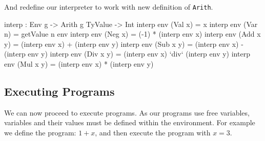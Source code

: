 And redefine our interpreter to work with new definition of \texttt{Arith}.

\begin{code}
interp : Env g -> Arith g TyValue -> Int
interp env (Val x)    = x
interp env (Var n)    = getValue n env
interp env (Neg x)    = (-1) * (interp env x)
interp env (Add x y)  = (interp env x) + (interp env y)
interp env (Sub x y)  = (interp env x) - (interp env y)
interp env (Div x y)  = (interp env x) `div` (interp env y)
interp env (Mul x y)  = (interp env x) * (interp env y)
\end{code}

\subsection{Executing Programs}
\label{sec:typed-arith-var:running}

We can now proceed to execute programs.
As our programs use free variables, variables and their values must be defined within the environment.
For example we define the program: $1 + x$, and then execute the program with $x=3$.


